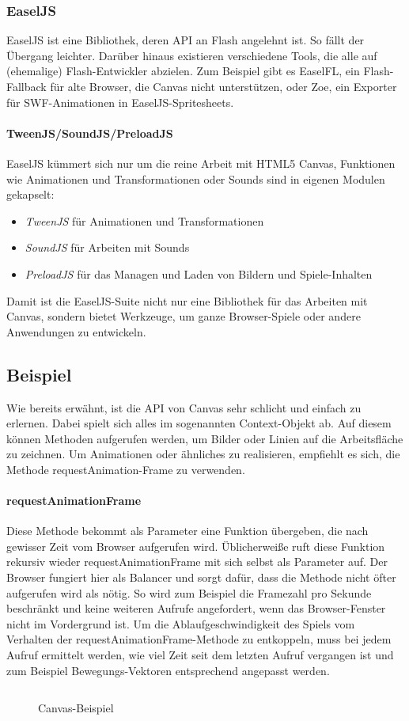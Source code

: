 \documentclass[a4paper, 12pt]{article}
\begin{document}
\subsubsection{EaselJS}
EaselJS ist eine Bibliothek, deren API an Flash angelehnt ist. So fällt der Übergang leichter. Darüber hinaus existieren verschiedene Tools, die alle auf (ehemalige) Flash-Entwickler abzielen. Zum Beispiel gibt es EaselFL, ein Flash-Fallback für alte Browser, die Canvas nicht unterstützen, oder Zoe, ein Exporter für SWF-Animationen in EaselJS-Spritesheets.
\paragraph{TweenJS/SoundJS/PreloadJS} EaselJS kümmert sich nur um die reine Arbeit mit HTML5 Canvas, Funktionen wie Animationen und Transformationen oder Sounds sind in eigenen Modulen gekapselt:
\begin{itemize}
	\item \emph{TweenJS} für Animationen und Transformationen
	\item \emph{SoundJS} für Arbeiten mit Sounds
	\item \emph{PreloadJS} für das Managen und Laden von Bildern und Spiele-Inhalten
\end{itemize}
Damit ist die EaselJS-Suite nicht nur eine Bibliothek für das Arbeiten mit Canvas, sondern bietet Werkzeuge, um ganze Browser-Spiele oder andere Anwendungen zu entwickeln.\cite{EaselJS}
\subsection{Beispiel}
Wie bereits erwähnt, ist die API von Canvas sehr schlicht und einfach zu erlernen. Dabei spielt sich alles im sogenannten Context-Objekt ab. Auf diesem können Methoden aufgerufen werden, um Bilder oder Linien auf  die Arbeitsfläche zu zeichnen. Um Animationen oder ähnliches zu realisieren, empfiehlt es sich, die Methode requestAnimation-Frame zu verwenden.
\paragraph{requestAnimationFrame} Diese Methode bekommt als Parameter eine Funktion übergeben, die nach gewisser Zeit vom Browser aufgerufen wird. Üblicherweiße ruft diese Funktion rekursiv wieder requestAnimationFrame mit sich selbst als Parameter auf. Der Browser fungiert hier als Balancer und sorgt dafür, dass die Methode nicht öfter aufgerufen wird als nötig. So wird zum Beispiel die Framezahl pro Sekunde beschränkt und keine weiteren Aufrufe angefordert, wenn das Browser-Fenster nicht im Vordergrund ist. Um die Ablaufgeschwindigkeit des Spiels vom Verhalten der requestAnimationFrame-Methode zu entkoppeln, muss bei jedem Aufruf ermittelt werden, wie viel Zeit seit dem letzten Aufruf vergangen ist und zum Beispiel Bewegungs-Vektoren entsprechend angepasst werden.\cite{RequestAnim}
\begin{figure}[H]
	\inputminted{javascript}{assets/vanillacanvas_example.js}
	\caption{Canvas-Beispiel}
	\label{canvas_support2}
\end{figure}
\end{document}
